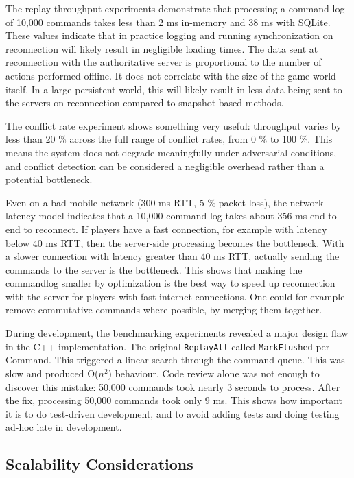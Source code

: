 \documentclass{article}
\begin{document}
The replay throughput experiments demonstrate that processing a command log of 10,000 commands takes less than 2 ms in-memory and 38 ms with SQLite. These values indicate that in practice logging and running synchronization on reconnection will likely result in negligible loading times. The data sent at reconnection with the authoritative server is proportional to the number of actions performed offline. It does not correlate with the size of the game world itself. In a large persistent world, this will likely result in less data being sent to the servers on reconnection compared to snapshot-based methods.

The conflict rate experiment shows something very useful: throughput varies by less than 20 \% across the full range of conflict rates, from 0 \% to 100 \%. This means the system does not degrade meaningfully under adversarial conditions, and conflict detection can be considered a negligible overhead rather than a potential bottleneck.

Even on a bad mobile network (300 ms RTT, 5 \% packet loss), the network latency model indicates that a 10,000-command log takes about 356 ms end-to-end to reconnect. If players have a fast connection, for example with latency below 40 ms RTT, then the server-side processing becomes the bottleneck. With a slower connection with latency greater than 40 ms RTT, actually sending the commands to the server is the bottleneck. This shows that making the commandlog smaller by optimization is the best way to speed up reconnection with the server for players with fast internet connections. One could for example remove commutative commands where possible, by merging them together.

During development, the benchmarking experiments revealed a major design flaw in the C++ implementation. The original \texttt{ReplayAll} called \texttt{MarkFlushed} per Command. This triggered a linear search through the command queue. This was slow and produced O($n^2$) behaviour. Code review alone was not enough to discover this mistake: 50,000 commands took nearly 3 seconds to process. After the fix, processing 50,000 commands took only 9 ms. This shows how important it is to do test-driven development, and to avoid adding tests and doing testing ad-hoc late in development.

\subsection{Scalability Considerations}
\label{sec:scale}
\end{document}
